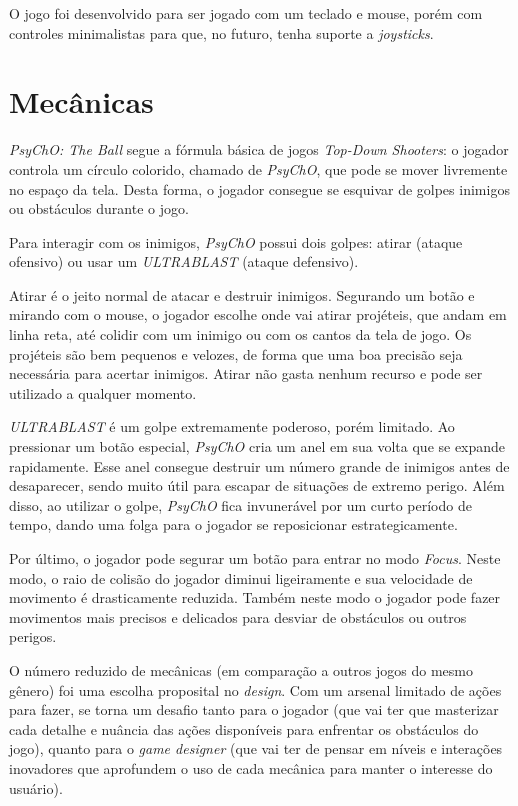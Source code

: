 O jogo foi desenvolvido para ser jogado com um teclado e mouse, porém com controles minimalistas para que, no futuro, tenha suporte a \textit{joysticks}.

\section{Mecânicas}
\label{sec:mecanicas}

\textit{PsyChO: The Ball} segue a fórmula básica de jogos \textit{Top-Down Shooters}: o jogador controla um círculo colorido, chamado de \textit{PsyChO}, que pode se mover livremente no espaço da tela. Desta forma, o jogador consegue se esquivar de golpes inimigos ou obstáculos durante o jogo.

Para interagir com os inimigos, \textit{PsyChO} possui dois golpes: atirar (ataque ofensivo) ou usar um \textit{ULTRABLAST} (ataque defensivo).

Atirar é o jeito normal de atacar e destruir inimigos. Segurando um botão e mirando com o mouse, o jogador escolhe onde vai atirar projéteis, que andam em linha reta, até colidir com um inimigo ou com os cantos da tela de jogo. Os projéteis são bem pequenos e velozes, de forma que uma boa precisão seja necessária para acertar inimigos. Atirar não gasta nenhum recurso e pode ser utilizado a qualquer momento.

\textit{ULTRABLAST} é um golpe extremamente poderoso, porém limitado. Ao pressionar um botão especial, \textit{PsyChO} cria um anel em sua volta que se expande rapidamente. Esse anel consegue destruir um número grande de inimigos antes de desaparecer, sendo muito útil para escapar de situações de extremo perigo. Além disso, ao utilizar o golpe, \textit{PsyChO} fica invunerável por um curto período de tempo, dando uma folga para o jogador se reposicionar estrategicamente.

Por último, o jogador pode segurar um botão para entrar no modo \textit{Focus}. Neste modo, o raio de colisão do jogador diminui ligeiramente e sua velocidade de movimento é drasticamente reduzida. Também neste modo o jogador pode fazer movimentos mais precisos e delicados para desviar de obstáculos ou outros perigos.

O número reduzido de mecânicas (em comparação a outros jogos do mesmo gênero) foi uma escolha proposital no \textit{design}. Com um arsenal limitado de ações para fazer, se torna um desafio tanto para o jogador (que vai ter que masterizar cada detalhe e nuância das ações disponíveis para enfrentar os obstáculos do jogo), quanto para o \textit{game designer} (que vai ter de pensar em níveis e interações inovadores que aprofundem o uso de cada mecânica para manter o interesse do usuário).

